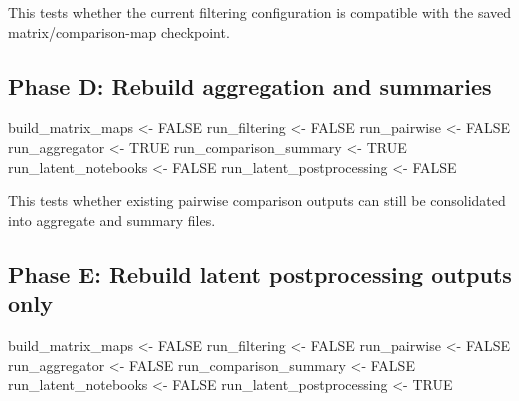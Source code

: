 \documentclass[
  letterpaper,
  DIV=11,
  numbers=noendperiod,
  openany,
  oneside]{scrreprt}
\newenvironment{Shaded}{\begin{snugshade}}{\end{snugshade}}
\newcommand{\ConstantTok}[1]{\textcolor[rgb]{0.56,0.35,0.01}{#1}}
\newcommand{\NormalTok}[1]{\textcolor[rgb]{0.00,0.23,0.31}{#1}}
\newcommand{\OtherTok}[1]{\textcolor[rgb]{0.00,0.23,0.31}{#1}}
\begin{document}
This tests whether the current filtering configuration is compatible
with the saved matrix/comparison-map checkpoint.

\subsection*{Phase D: Rebuild aggregation and
summaries}\label{phase-d-rebuild-aggregation-and-summaries}

\begin{Shaded}
\begin{Highlighting}[]
\NormalTok{build\_matrix\_maps       }\OtherTok{\textless{}{-}} \ConstantTok{FALSE}
\NormalTok{run\_filtering           }\OtherTok{\textless{}{-}} \ConstantTok{FALSE}
\NormalTok{run\_pairwise            }\OtherTok{\textless{}{-}} \ConstantTok{FALSE}
\NormalTok{run\_aggregator          }\OtherTok{\textless{}{-}} \ConstantTok{TRUE}
\NormalTok{run\_comparison\_summary  }\OtherTok{\textless{}{-}} \ConstantTok{TRUE}
\NormalTok{run\_latent\_notebooks    }\OtherTok{\textless{}{-}} \ConstantTok{FALSE}
\NormalTok{run\_latent\_postprocessing }\OtherTok{\textless{}{-}} \ConstantTok{FALSE}
\end{Highlighting}
\end{Shaded}

This tests whether existing pairwise comparison outputs can still be
consolidated into aggregate and summary files.

\subsection*{Phase E: Rebuild latent postprocessing outputs
only}\label{phase-e-rebuild-latent-postprocessing-outputs-only}

\begin{Shaded}
\begin{Highlighting}[]
\NormalTok{build\_matrix\_maps       }\OtherTok{\textless{}{-}} \ConstantTok{FALSE}
\NormalTok{run\_filtering           }\OtherTok{\textless{}{-}} \ConstantTok{FALSE}
\NormalTok{run\_pairwise            }\OtherTok{\textless{}{-}} \ConstantTok{FALSE}
\NormalTok{run\_aggregator          }\OtherTok{\textless{}{-}} \ConstantTok{FALSE}
\NormalTok{run\_comparison\_summary  }\OtherTok{\textless{}{-}} \ConstantTok{FALSE}
\NormalTok{run\_latent\_notebooks    }\OtherTok{\textless{}{-}} \ConstantTok{FALSE}
\NormalTok{run\_latent\_postprocessing }\OtherTok{\textless{}{-}} \ConstantTok{TRUE}
\end{Highlighting}
\end{Shaded}
\end{document}
